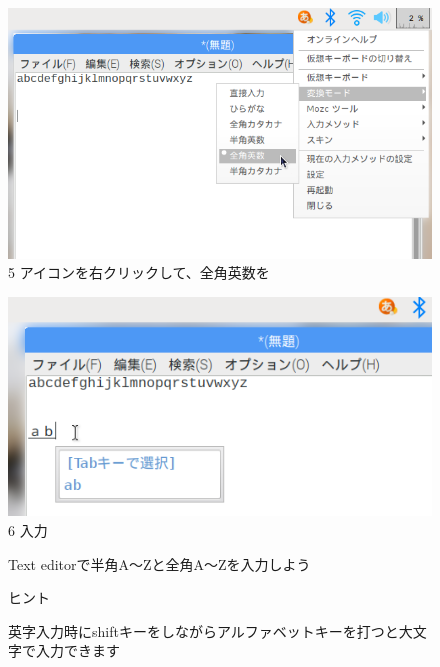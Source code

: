 \documentclass[a4paper,12pt]{jarticle}
\begin{document}
\begin{figure}[ht]
  \begin{minipage}{\textwidth}
    \begin{minipage}{0.45\textwidth}
      \includegraphics[width=0.75\linewidth]{textbook-img069.png}\\
      5 アイコンを右クリックして、全角英数を
    \end{minipage}
    \begin{minipage}{2.582cm}
    \end{minipage}
    \begin{minipage}{0.45\textwidth}
      \includegraphics[width=0.75\linewidth]{textbook-img070.png}\\
      6 入力
    \end{minipage}
  \end{minipage}

  \vspace{3mm}
  \begin{minipage}{\textwidth}
    {\centering\textbf{\color{red}{
      プログラミングでアルファベット,記号を入力するときは
      半角(小さい文字)で入力しましょう}}
    }
  \end{minipage}

  \theQuestion\label{Q:hasAnswer02-5}

  Text editorで半角A〜Zと全角A〜Zを入力しよう

  ヒント


  英字入力時にshiftキーをしながらアルファベットキーを打つと大文字で入力できます
\end{figure}
\end{document}
